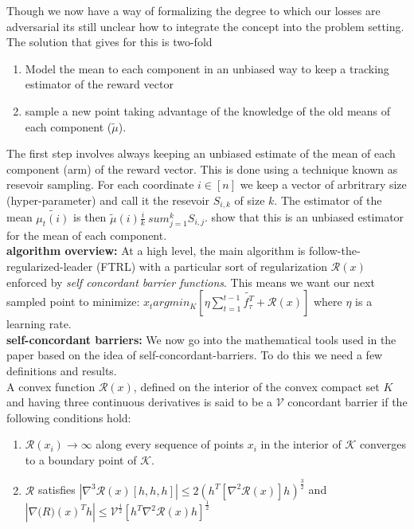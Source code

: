 Though we now have a way of formalizing the degree to which our losses are adversarial its still unclear
how to integrate the concept into the problem setting. The solution that \citep{hazan} gives for this is two-fold
\begin{enumerate}
\item
  Model the mean to each component in an unbiased way to keep a tracking estimator of the reward vector 
\item
  sample a new point taking advantage of the knowledge of the old means of each component ($\tilde{\mu}$).
\end{enumerate}

The first step involves always keeping an unbiased estimate of the mean of each component (arm) of 
the reward vector. This is done using a technique known as resevoir sampling.
For each coordinate $i\in[n]$ we keep a vector of arbritrary size (hyper-parameter) and call it the resevoir $S_{i, k}$ of size $k$.
The estimator of the mean $\tilde{\mu_t(i)}$ is then  $\tilde{\mu}(i) \frac{i}{k} \ sum_{j=1}^kS_{i, j}$. 
\citep{hazan} show that this is an unbiased estimator for the mean of each component.\\


\textbf{algorithm overview:}
At a high level, the main algorithm is follow-the-regularized-leader (FTRL) with a particular
sort of regularization  $\mathcal{R}(x)$ enforced by \textit{self concordant barrier functions}. This means we want our next sampled point 
to minimize:  $x_t  argmin_{K}[\eta \sum_{t=1}^{t-1} \tilde{f_{\tau}^T} + \mathcal{R}(x)]$ where $\eta$ is a learning rate. \\

\textbf{self-concordant barriers:}
We now go into the mathematical tools used in the paper based on the idea of self-concordant-barriers. To do this we need a few definitions and results.\\

A convex function $\mathcal{R}(x)$,  defined on the interior of the convex compact set $K$ and having three continuous derivatives is said to be a $\mathcal{V}$ concordant barrier if the following 
conditions hold:

\begin{enumerate}
\item
  $\mathcal{R}(x_i) \rightarrow \infty$ along every sequence of points $x_i$ in the interior of $\mathcal{K}$ converges to a boundary point of $\mathcal{K}$.

\item
$\mathcal{R}$ satisfies $|\nabla^3 \mathcal{R}(x) [h, h, h]| \leq 2(h^T [\nabla^2 \mathcal{R}(x)]h)^{\frac{3}{2}}$ and $|\nabla \mathcal(R)(x)^T h| \leq \mathcal{V}^{\frac{1}{2}}[h^T \nabla^2 \mathcal{R}(x) h]^\frac{1}{2}$

\end{enumerate}

